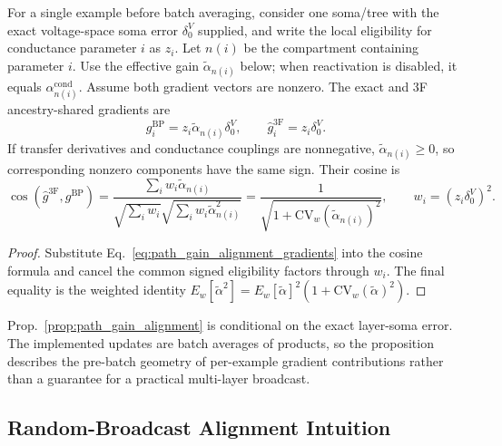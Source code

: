     \begin{proposition}
    \label{prop:path_gain_alignment}
    For a single example before batch averaging, consider one soma/tree with the exact voltage-space soma error $\delta_0^V$ supplied, and write the local eligibility for conductance parameter $i$ as $z_i$. Let $n(i)$ be the compartment containing parameter $i$. Use the effective gain $\tilde{\alpha}_{n(i)}$ below; when reactivation is disabled, it equals $\alpha_{n(i)}^{\mathrm{cond}}$. Assume both gradient vectors are nonzero. The exact and 3F ancestry-shared gradients are
    \begin{equation}
    g_i^{\mathrm{BP}}=z_i\tilde{\alpha}_{n(i)}\delta_0^V,
    \qquad
    \widehat{g}_i^{\mathrm{3F}}=z_i\delta_0^V .
    \label{eq:path_gain_alignment_gradients}
    \end{equation}
    If transfer derivatives and conductance couplings are nonnegative, $\tilde{\alpha}_{n(i)}\geq0$, so corresponding nonzero components have the same sign. Their cosine is
    \begin{equation}
    \cos(\widehat{g}^{\mathrm{3F}},g^{\mathrm{BP}})
    =
    \frac{\sum_i w_i\tilde{\alpha}_{n(i)}}
    {\sqrt{\sum_i w_i}\sqrt{\sum_i w_i\tilde{\alpha}_{n(i)}^2}}
    =
    \frac{1}{\sqrt{1+\mathrm{CV}_w(\tilde{\alpha}_{n(i)})^2}},
    \qquad
    w_i=(z_i\delta_0^V)^2 .
    \label{eq:path_gain_alignment_cosine}
    \end{equation}
    \end{proposition}
    \begin{proof}
    Substitute Eq.~\eqref{eq:path_gain_alignment_gradients} into the cosine formula and cancel the common signed eligibility factors through $w_i$. The final equality is the weighted identity $E_w[\tilde{\alpha}^2]=E_w[\tilde{\alpha}]^2(1+\mathrm{CV}_w(\tilde{\alpha})^2)$.
    \end{proof}

    Prop.~\ref{prop:path_gain_alignment} is conditional on the exact layer-soma error. The implemented updates are batch averages of products, so the proposition describes the pre-batch geometry of per-example gradient contributions rather than a guarantee for a practical multi-layer broadcast.
    
    \subsection{Random-Broadcast Alignment Intuition}
    
